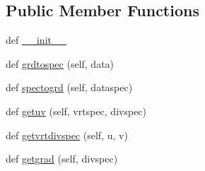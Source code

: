 \subsection*{Public Member Functions}
\begin{DoxyCompactItemize}
\item 
def \hyperlink{classshallow__water_1_1Spharmt_a03fd51b970fa1bfe29f3cb4efd3ac31f}{\+\_\+\+\_\+init\+\_\+\+\_\+}
\item 
def \hyperlink{classshallow__water_1_1Spharmt_a188caea350ae7e548e75cd7011242b43}{grdtospec} (self, data)
\item 
def \hyperlink{classshallow__water_1_1Spharmt_a5ce9185948d15d314b0d0fc233284639}{spectogrd} (self, dataspec)
\item 
def \hyperlink{classshallow__water_1_1Spharmt_aa69e8c9f102ee6e19217b71740545bbe}{getuv} (self, vrtspec, divspec)
\item 
def \hyperlink{classshallow__water_1_1Spharmt_abbe0354bbc6180f3fa8449cfb6b045e6}{getvrtdivspec} (self, u, v)
\item 
def \hyperlink{classshallow__water_1_1Spharmt_ad0a7eeb0530ce2eeac2194b9c8f9c115}{getgrad} (self, divspec)
\end{DoxyCompactItemize}
